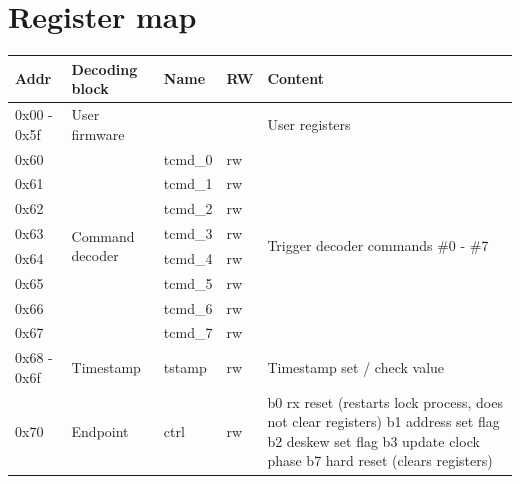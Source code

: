 \documentclass{article}
\begin{document}


\section{Register map}

\begin{table}[h!]
\begin{tabularx}{\textwidth}{|
p{}|
p{}|
p{}|
p{}|
p{}|} \hline
\textbf{Addr} & \textbf{Decoding block} & \textbf{Name} & \textbf{RW} & \textbf{Content} \\\hline 
0x00 - 0x5f   & User firmware           &               &               & User registers \\\hline 
0x60          & \multirow{8}{=}{Command decoder}  & tcmd\_0 & rw & \multirow{8}{=}{Trigger decoder commands \#0 - \#7}  \\\cline{1-1}\cline{3-4}
0x61          &                         & tcmd\_1 & rw &  \\\cline{1-1}\cline{3-4}
0x62          &                         & tcmd\_2 & rw &  \\\cline{1-1}\cline{3-4}
0x63          &                         & tcmd\_3 & rw &  \\\cline{1-1}\cline{3-4}
0x64          &                         & tcmd\_4 & rw &  \\\cline{1-1}\cline{3-4}
0x65          &                         & tcmd\_5 & rw &  \\\cline{1-1}\cline{3-4}
0x66          &                         & tcmd\_6 & rw &  \\\cline{1-1}\cline{3-4}
0x67          &                         & tcmd\_7 & rw &  \\\hline 
0x68 - 0x6f   & Timestamp               & tstamp & rw & Timestamp set / check value \\\hline 
0x70          & \multirow{6}{=}{Endpoint}  & ctrl & rw & b0 rx reset (restarts lock process, does not clear registers) \newline b1 address set flag \newline b2 deskew set flag \newline b3 update clock phase \newline b7 hard reset (clears registers) \\\cline{1-1}\cline{3-5}

\end{tabularx}
\end{table}
\end{document}
